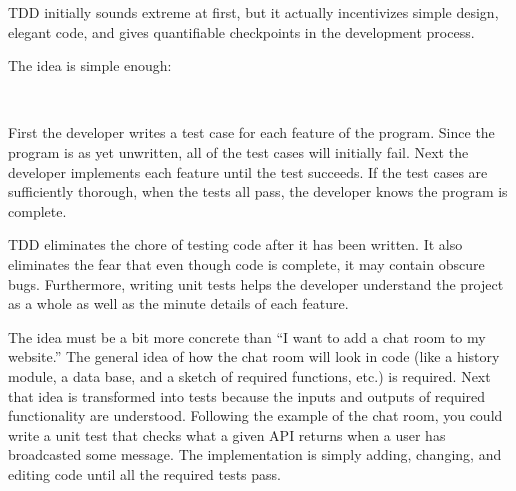 TDD initially sounds extreme at first, but it actually incentivizes simple design, elegant code, and gives quantifiable checkpoints in the development process.

The idea is simple enough:
\begin{center}
\\
\end{center}

First the developer writes a test case for each feature of the program. Since the program is as yet unwritten, all of the test cases will initially fail. Next the developer implements each feature until the test succeeds. If the test cases are sufficiently thorough, when the tests all pass, the developer knows the program is complete.

TDD eliminates the chore of testing code after it has been written. It also eliminates the fear that even though code is complete, it may contain obscure bugs. Furthermore, writing unit tests helps the developer understand the project as a whole as well as the minute details of each feature.

The idea must be a bit more concrete than ``I want to add a chat room to my website.'' The general idea of how the chat room will look in code (like a history module, a data base, and a sketch of required functions, etc.) is required.
Next that idea is transformed into tests because the inputs and outputs of required functionality are understood.
Following the example of the chat room, you could write a unit test that checks what a given API returns when a user has broadcasted some message.
The implementation is simply adding, changing, and editing code until all the required tests pass.


